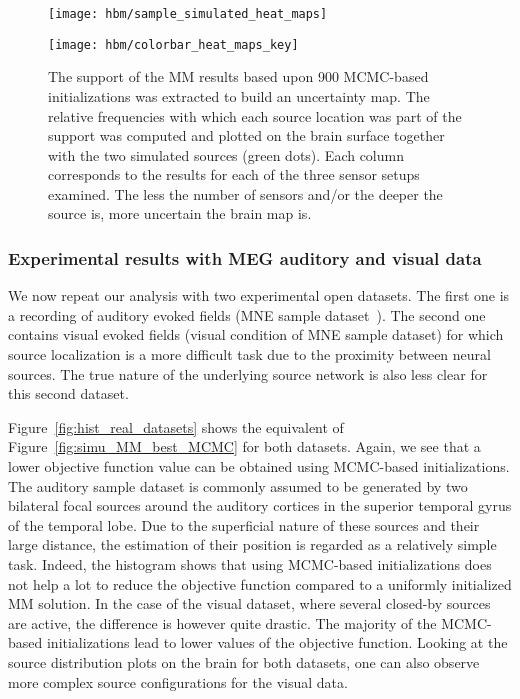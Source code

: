 \begin{figure}[htp]
	\centering
	\begin{minipage}{\linewidth}
		\begin{minipage}{0.9\linewidth}
			\setlength\tabcolsep{0.1pt} %
			\texttt{[image: hbm/sample\_simulated\_heat\_maps]}%
		\end{minipage}
		\begin{minipage}{0.09\linewidth}
				\texttt{[image: hbm/colorbar\_heat\_maps\_key]}%
		\end{minipage}
	\end{minipage}
	\caption{The support of the MM results based upon 900 MCMC-based initializations was extracted to build an uncertainty map. The relative frequencies with which each source location was part of the support was computed and plotted on the brain surface together with the two simulated sources (green dots). Each column corresponds to the results for each of the three sensor setups examined. The less the number of sensors and/or the deeper the source is, more uncertain the brain map is.}
	\label{fig:results_simu_heat_maps}
\end{figure}

\subsubsection{Experimental results with MEG auditory and visual data}
We now repeat our analysis with two experimental open datasets. The first one is a recording of auditory evoked fields (MNE sample dataset~\cite{mne-python}). The second one contains visual evoked fields (visual condition of MNE sample dataset) for which source localization is a more difficult task due to the proximity between neural sources. The true nature of the underlying source network is also less clear for this second dataset.

Figure~\ref{fig:hist_real_datasets} shows the equivalent of Figure~\ref{fig:simu_MM_best_MCMC} for both datasets. Again, we see that a lower objective function value can be obtained using MCMC-based initializations. The auditory sample dataset is commonly assumed to be generated by two bilateral focal sources around the auditory cortices in the superior temporal gyrus of the temporal lobe. Due to the superficial nature of these sources and their large distance, the estimation of their position is regarded as a relatively simple task. Indeed, the histogram shows that using MCMC-based initializations does not help a lot to reduce the objective function compared to a uniformly initialized MM solution. In the case of the visual dataset, where several closed-by sources are active, the difference is however quite drastic. The majority of the MCMC-based initializations lead to lower values of the objective function. Looking at the source distribution plots on the brain for both datasets, one can also observe more complex source configurations for the visual data.

